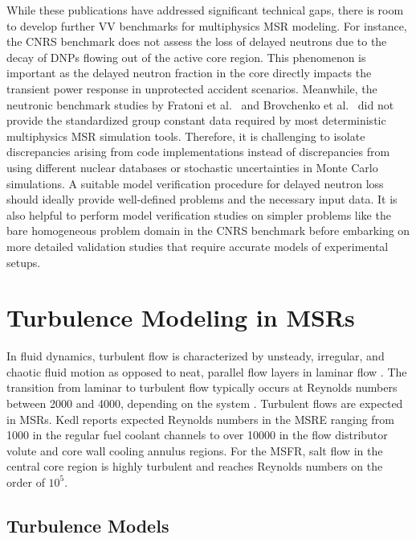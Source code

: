 While these publications have addressed significant technical gaps, there is room to develop
further \gls{VV} benchmarks for multiphysics \gls{MSR} modeling. For instance, the CNRS benchmark
does not assess the loss of delayed neutrons due to the decay of \glspl{DNP} flowing out of the
active core region. This phenomenon is important as the delayed neutron fraction in the core
directly impacts the transient power response in unprotected accident scenarios. Meanwhile, the
neutronic benchmark studies by Fratoni et al.\ \cite{fratoni_molten_2020} and Brovchenko et al.\
\cite{brovchenko_neutronic_2019} did not provide the standardized group constant data required by
most deterministic multiphysics \gls{MSR} simulation tools. Therefore, it is challenging to isolate
discrepancies arising from code implementations instead of discrepancies from using different
nuclear databases or stochastic uncertainties in Monte Carlo simulations. A suitable model
verification procedure for delayed neutron loss should ideally provide well-defined problems and
the necessary input data. It is also helpful to perform model verification studies on simpler
problems like the bare homogeneous problem domain in the CNRS benchmark before embarking on more
detailed validation studies that require accurate models of experimental setups.

\section{Turbulence Modeling in MSRs}

In fluid dynamics, turbulent flow is characterized by unsteady, irregular, and
chaotic fluid motion as opposed to neat, parallel flow layers in laminar flow
\cite{pope_turbulent_2000}. The transition from laminar to turbulent flow
typically occurs at Reynolds numbers between 2000 and 4000, depending on the
system \cite{pope_turbulent_2000}. Turbulent flows are expected in \glspl{MSR}.
Kedl \cite{kedl_fluid_1970} reports expected Reynolds numbers in the \gls{MSRE}
ranging from 1000 in the regular fuel coolant channels to over 10000 in the
flow distributor volute and core wall cooling annulus regions. For the
\gls{MSFR}, salt flow in the central core region is highly turbulent and
reaches Reynolds numbers on the order of $10^5$.

\subsection{Turbulence Models}

